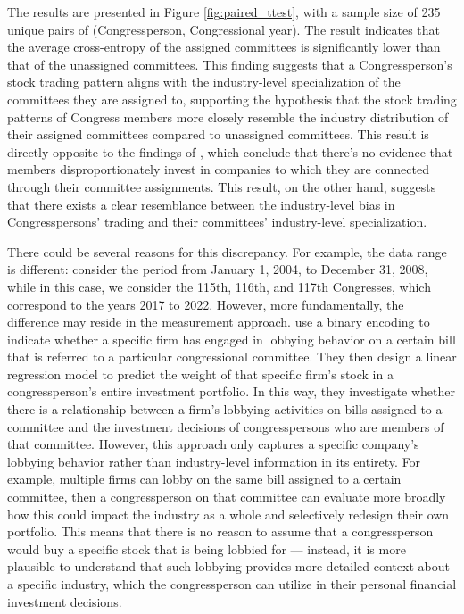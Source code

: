 \documentclass[15pt,letterpaper]{article}
\begin{document}
The results are presented in Figure \ref{fig:paired_ttest}, with a sample size of 235 unique pairs of (Congressperson, Congressional year). The result indicates that the average cross-entropy of the assigned committees is significantly lower than that of the unassigned committees. This finding suggests that a Congressperson's stock trading pattern aligns with the industry-level specialization of the committees they are assigned to, supporting the hypothesis that the stock trading patterns of Congress members more closely resemble the industry distribution of their assigned committees compared to unassigned committees.
This result is directly opposite to the findings of \cite{eg14}, which conclude that there's no evidence that members disproportionately invest in companies to which they are connected through their committee assignments. 
This result, on the other hand, suggests that there exists a clear resemblance between the industry-level bias in Congresspersons' trading and their committees' industry-level specialization.


There could be several reasons for this discrepancy. For example, the data range is different: \cite{eg14} consider the period from January 1, 2004, to December 31, 2008, while in this case, we consider the 115th, 116th, and 117th Congresses, which correspond to the years 2017 to 2022. However, more fundamentally, the difference may reside in the measurement approach.
\cite{eg14} use a binary encoding to indicate whether a specific firm has engaged in lobbying behavior on a certain bill that is referred to a particular congressional committee. They then design a linear regression model to predict the weight of that specific firm's stock in a congressperson's entire investment portfolio. In this way, they investigate whether there is a relationship between a firm's lobbying activities on bills assigned to a committee and the investment decisions of congresspersons who are members of that committee. However, this approach only captures a specific company's lobbying behavior rather than industry-level information in its entirety. For example, multiple firms can lobby on the same bill assigned to a certain committee, then a congressperson on that committee can evaluate more broadly how this could impact the industry as a whole and selectively redesign their own portfolio. This means that there is no reason to assume that a congressperson would buy a specific stock that is being lobbied for — instead, it is more plausible to understand that such lobbying provides more detailed context about a specific industry, which the congressperson can utilize in their personal financial investment decisions.
\end{document}
